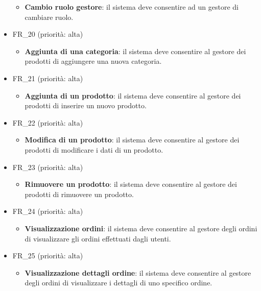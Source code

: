 \documentclass[12pt, a4paper, oneside]{book}
\begin{document}
\begin{itemize}
\begin{itemize}
                   \item \textbf{Cambio ruolo gestore}: il sistema deve consentire ad un gestore di cambiare ruolo.
                \end{itemize}
            \item FR\_20 (priorità: alta)
               \begin{itemize}
                   \item \textbf{Aggiunta di una categoria}: il sistema deve consentire al gestore dei prodotti di aggiungere una nuova categoria.
                \end{itemize}
            \item FR\_21 (priorità: alta)
               \begin{itemize}
                   \item \textbf{Aggiunta di un prodotto}: il sistema deve consentire al gestore dei prodotti di inserire un nuovo prodotto.
                \end{itemize}
            \item FR\_22 (priorità: alta)
               \begin{itemize}
                   \item \textbf{Modifica di un prodotto}: il sistema deve consentire al gestore dei prodotti di modificare i dati di un prodotto.
                \end{itemize}
            \item FR\_23 (priorità: alta)
               \begin{itemize}
                   \item \textbf{Rimuovere un prodotto}: il sistema deve consentire al gestore dei prodotti di rimuovere un prodotto.
                \end{itemize}
            \item FR\_24 (priorità: alta)
               \begin{itemize}
                   \item \textbf{Visualizzazione ordini}: il sistema deve consentire al gestore degli ordini di visualizzare gli ordini effettuati dagli utenti.
                \end{itemize}
            \item FR\_25 (priorità: alta)
               \begin{itemize}
                   \item \textbf{Visualizzazione dettagli ordine}: il sistema deve consentire al gestore degli ordini di visualizzare i dettagli di uno specifico ordine.

\end{itemize}
\end{itemize}
\end{document}
